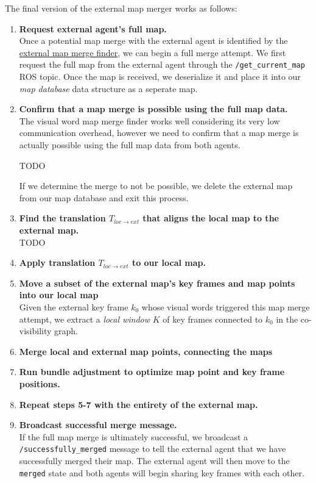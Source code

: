 The final version of the external map merger works as follows:

\begin{enumerate}
    \item \textbf{Request external agent's full map.} \\
          Once a potential map merge with the external agent is identified by the \hyperref[sec:external-map-merge-finder]{external map merge finder}, we can begin a full merge attempt. We first request the full map from the external agent through the \texttt{/get\_current\_map} ROS topic. Once the map is received, we deserialize it and place it into our \textit{map database} data structure as a seperate map.
    \item \textbf{Confirm that a map merge is possible using the full map data.} \\
          The visual word map merge finder works well considering its very low communication overhead, however we need to confirm that a map merge is actually possible using the full map data from both agents.

          TODO

          If we determine the merge to not be possible, we delete the external map from our map database and exit this process.
    \item \textbf{Find the translation $T_{loc \rightarrow ext}$ that aligns the local map to the external map.} \\
          TODO
    \item \textbf{Apply translation $T_{loc \rightarrow ext}$ to our local map.} \\
    \item \textbf{Move a subset of the external map's key frames and map points into our local map} \\
          Given the external key frame $k_0$ whose visual words triggered this map merge attempt, we extract a \textit{local window} $K$ of key frames connected to $k_0$ in the co-visibility graph.
    \item \textbf{Merge local and external map points, connecting the maps} \\
    \item \textbf{Run bundle adjustment to optimize map point and key frame positions.} \\
    \item \textbf{Repeat steps 5-7 with the entirety of the external map.} \\
    \item \textbf{Broadcast successful merge message.} \\
          If the full map merge is ultimately successful, we broadcast a \texttt{/successfully\_merged} message to tell the external agent that we have successfully merged their map. The external agent will then move to the \texttt{merged} state and both agents will begin sharing key frames with each other.

\end{enumerate}

